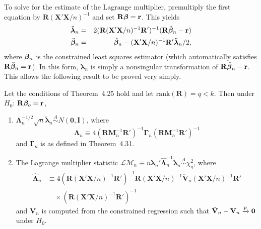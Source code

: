 To solve for the estimate of the Lagrange multiplier, premultiply the first
equation by $\mathbf{R}(\mathbf{X}'\mathbf{X}/n)^{-1}$ and set $\mathbf{R}\boldsymbol{\beta} = \mathbf{r}$. This yields
\begin{eqnarray*}
\ddot{\boldsymbol{\lambda}}_n &=& 2(\mathbf{R}(\mathbf{X}'\mathbf{X}/n)^{-1}\mathbf{R}')^{-1}(\mathbf{R}\hat{\boldsymbol{\beta}}_n - \mathbf{r})\\
\ddot{\boldsymbol{\beta}}_n &=& \hat{\boldsymbol{\beta}}_n - (\mathbf{X}'\mathbf{X}/n)^{-1}\mathbf{R}'\ddot{\boldsymbol{\lambda}}_n/2,
\end{eqnarray*}
where $\ddot{\boldsymbol{\beta}}_n$ is the constrained least squares estimator (which automatically
satisfies $\mathbf{R}\ddot{\boldsymbol{\beta}}_n = \mathbf{r}$). In this form, $\ddot{\boldsymbol{\lambda}}_n$ is simply a nonsingular transformation
of $\mathbf{R}\hat{\boldsymbol{\beta}}_n - \mathbf{r}$. This allows the following result to be proved very simply.

\begin{theorem}\label{thm:4.32}
Let the conditions of Theorem~4.25 hold and let $\mathrm{rank}(\mathbf{R}) = q < k$. Then under $H_0$: $\mathbf{R}\boldsymbol{\beta}_o = \mathbf{r}$,
\begin{enumerate}[label=(\roman*)]
\item $\boldsymbol{\Lambda}_n^{-1/2}\sqrt{n}\ddot{\boldsymbol{\lambda}}_n \overset{A}{\sim} N(\mathbf{0}, \mathbf{I})$, where
\[
\boldsymbol{\Lambda}_n \equiv 4(\mathbf{R}\mathbf{M}_n^{-1}\mathbf{R}')^{-1}\boldsymbol{\Gamma}_n(\mathbf{R}\mathbf{M}_n^{-1}\mathbf{R}')^{-1}
\]
and $\boldsymbol{\Gamma}_n$ is as defined in Theorem~4.31.

\item The Lagrange multiplier statistic $\mathcal{LM}_n \equiv n\ddot{\boldsymbol{\lambda}}_n'\hat{\boldsymbol{\Lambda}}_n^{-1}\ddot{\boldsymbol{\lambda}}_n \overset{A}{\sim} \chi_q^2$, where
\begin{align*}
\hat{\boldsymbol{\Lambda}}_n &\equiv 4(\mathbf{R}(\mathbf{X}'\mathbf{X}/n)^{-1}\mathbf{R}')^{-1}\mathbf{R}(\mathbf{X}'\mathbf{X}/n)^{-1}\ddot{\mathbf{V}}_n(\mathbf{X}'\mathbf{X}/n)^{-1}\mathbf{R}'\\
&\quad\times(\mathbf{R}(\mathbf{X}'\mathbf{X}/n)^{-1}\mathbf{R}')^{-1}
\end{align*}
and $\ddot{\mathbf{V}}_n$ is computed from the constrained regression such that $\ddot{\mathbf{V}}_n - \mathbf{V}_n \xrightarrow{p} \mathbf{0}$ under $H_0$.
\end{enumerate}
\end{theorem}

